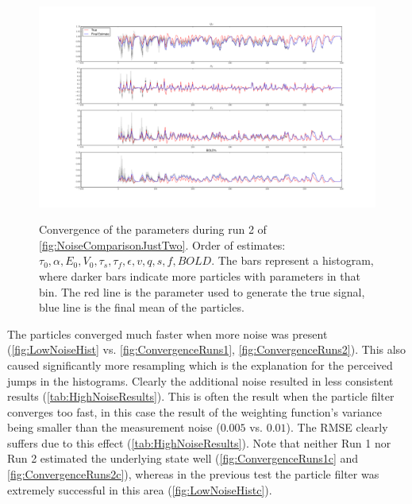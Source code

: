 \begin{figure}[H]
\subfigure
{\label{fig:ConvergenceRuns2c} \includegraphics[clip=true,trim=6cm 2cm 6cm 3cm, width=\textwidth]{images/highnoise_run6_3}}
\caption[Convergence of the parameters during run 2 of \autoref{fig:NoiseComparisonJustTwo}]
{Convergence of the parameters during run 2 of \autoref{fig:NoiseComparisonJustTwo}.
Order of estimates: $\tau_0, \alpha, E_0, V_0, \tau_s, \tau_f, \epsilon, v,
q, s, f, BOLD$.  The bars represent
a histogram, where darker bars indicate more particles with parameters in that bin. The red 
line is the parameter used to generate the true signal, blue line is the final mean of the
particles.}
\label{fig:ConvergenceRuns2}
\end{figure}

The particles converged much faster when more noise was present (\autoref{fig:LowNoiseHist} vs.
\autoref{fig:ConvergenceRuns1}, \autoref{fig:ConvergenceRuns2}).
This also caused significantly more resampling which
is the explanation for the perceived jumps in the histograms.
Clearly the additional noise resulted in less consistent results 
(\autoref{tab:HighNoiseResults}).
This is often the
result when the particle filter converges too fast, in this case the result of the
weighting function's variance being smaller than the measurement noise ($0.005$ vs. $0.01$).
The \ac{RMSE} clearly suffers due to this effect (\autoref{tab:HighNoiseResults}).
Note that neither Run 1 nor Run 2 estimated the underlying state well (\autoref{fig:ConvergenceRuns1c}
and \autoref{fig:ConvergenceRuns2c}), whereas
in the previous test the particle filter was extremely successful in this area (\autoref{fig:LowNoiseHistc}).

